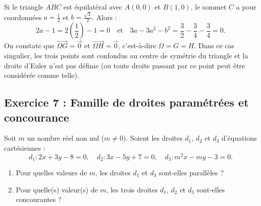 \documentclass[11pt,a4paper]{article}
\newcommand{\vect}[1]{\overrightarrow{#1}}
\begin{document}
\begin{remarkbox}
Si le triangle $ABC$ est équilatéral avec $A(0,0)$ et $B(1,0)$, le sommet $C$ a pour coordonnées $a = \frac{1}{2}$ et $b = \frac{\sqrt{3}}{2}$.
Alors :
\[
2a - 1 = 2\left(\frac{1}{2}\right) - 1 = 0 \quad \text{et} \quad 3a - 3a^2 - b^2 = \frac{3}{2} - \frac{3}{4} - \frac{3}{4} = 0.
\]
On constate que $\vect{\Omega G} = \vec{0}$ et $\vect{\Omega H} = \vec{0}$, c'est-à-dire $\Omega = G = H$. Dans ce cas singulier, les trois points sont confondus au centre de symétrie du triangle et la droite d'Euler n'est pas définie (ou toute droite passant par ce point peut être considérée comme telle).
\end{remarkbox}

\newpage
\subsection*{Exercice 7 : Famille de droites paramétrées et concourance}

\begin{enoncebox}
Soit $m$ un nombre réel non nul ($m \neq 0$). Soient les droites $d_1$, $d_2$ et $d_3$ d'équations cartésiennes :
\[
d_1 : 2x + 3y - 8 = 0, \quad d_2 : 3x - 5y + 7 = 0, \quad d_3 : m^2 x - m y - 3 = 0.
\]
\begin{enumerate}
    \item Pour quelles valeurs de $m$, les droites $d_1$ et $d_3$ sont-elles parallèles ?
    \item Pour quelle(s) valeur(s) de $m$, les trois droites $d_1$, $d_2$ et $d_3$ sont-elles concourantes ?
\end{enumerate}
\end{enoncebox}
\end{document}
